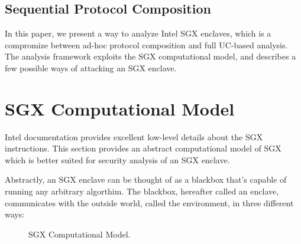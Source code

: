 \documentclass[10pt]{article}
\newcommand{\env}{\textsf{environment}}
\newcommand{\uc}{\textsf{UC}}
\begin{document}
  \subsection{Sequential Protocol Composition}

  In this paper, we present a way to analyze Intel SGX enclaves, which is
  a compromize between ad-hoc protocol composition and full \uc-based 
  analysis. The analysis framework exploits the SGX computational model, and 
  describes a few possible ways of attacking an SGX enclave.

  \section{SGX Computational Model}
  \label{sec:model}
  Intel documentation\cite{intelsdm} provides excellent low-level
  details about the SGX instructions. This section provides an
  abstract computational model of SGX which is better suited for
  security analysis of an SGX enclave.

  Abstractly, an SGX enclave can be thought of as a blackbox that's
  capable of running any arbitrary algorthim. The blackbox, hereafter
  called an enclave, communicates with the outside world, called the
  \env, in three different ways:

  \begin{figure}[h]
  \centering
  \label{fig:model}
  
  \caption{SGX Computational Model.}
  \end{figure}
\end{document}
